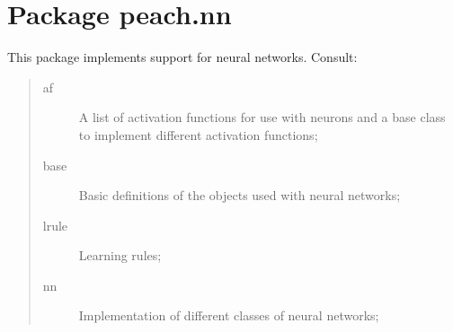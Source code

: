 %
%
%


\section{Package peach.nn}

    \label{peach:nn}

This package implements support for neural networks. Consult:
\begin{quote}
\begin{description}
\item[{af}] %

A list of activation functions for use with neurons and a base class to
implement different activation functions;

\item[{base}] %

Basic definitions of the objects used with neural networks;

\item[{lrule}] %

Learning rules;

\item[{nn}] %

Implementation of different classes of neural networks;

\end{description}
\end{quote}


